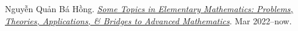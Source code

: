 \documentclass{article}
\numberwithin{equation}{section}
\begin{document}

\begin{thebibliography}{99}
	 Nguyễn Quản Bá Hồng. \href{https://github.com/NQBH/hobby/blob/master/elementary_mathematics/NQBH_elementary_mathematics.pdf}{\textit{Some Topics in Elementary Mathematics: Problems, Theories, Applications, \& Bridges to Advanced Mathematics}}. Mar 2022--now.
\end{thebibliography}


\printbibliography[heading=bibintoc]
	
\end{document}
